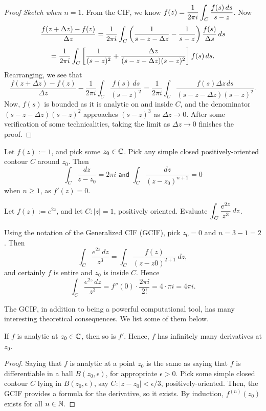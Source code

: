 \documentclass{article}
\begin{document}
\begin{proof}[Proof Sketch when $n=1$]
From the CIF, we know $f(z) = \displaystyle\frac 1{2\pi i} \int_C \frac{f(s)\, ds}{s-z}$. Now
$$\frac{f(z+\Delta z) - f(z)}{\Delta z} = \frac 1{2\pi i}\int_C \left(\frac 1{s-z-\Delta z} - \frac 1{s-z} \right) \frac{f(s)}{\Delta s}\, ds$$
$$=\frac 1{2\pi i}\int_C\left[\frac 1{(s-z)^2} + \frac{\Delta z}{(s-z-\Delta z)(s-z)^2}\right] f(s)\, ds.$$
Rearranging, we see that
$$\frac{f(z+\Delta z) - f(z)}{\Delta z} - \frac 1{2\pi i}\int_C \frac{f(s)\, ds}{(s-z)^2} = \frac 1{2\pi i}\int_C \frac{f(s)\Delta z\, ds}{(s-z-\Delta z)(s-z)^2}.$$
Now, $f(s)$ is bounded as it is analytic on and inside $C$, and the denominator $(s-z-\Delta z)(s-z)^2$ approaches $(s-z)^3$ as $\Delta z\to 0$. After some verification of some technicalities, taking the limit as $\Delta z\to 0$ finishes the proof.
\end{proof}
\begin{example}
Let $f(z) := 1$, and pick some $z_0\in\mathbb C$. Pick any simple closed positively-oriented contour $C$ around $z_0$. Then
$$\int_C \frac{dz}{z-z_0} = 2\pi i \textsf{ and } \int_C\frac{dz}{(z-z_0)^{n+1}} = 0$$
when $n\geq 1$, as $f'(z) = 0$.
\end{example}
\begin{example}
Let $f(z) := e^{2z}$, and let $C: |z|=1$, positively oriented. Evaluate $\displaystyle\int_C \frac{e^{2z}}{z^3}\, dz$.
\end{example}
\begin{solution}
Using the notation of the Generalized CIF (GCIF), pick $z_0 = 0$ and $n=3-1 = 2$. Then
$$\int_C \frac{e^{2z}\, dz}{z^3} = \int_C \frac{f(z)}{(z-z0)^{2+1}}\, dz,$$
and certainly $f$ is entire and $z_0$ is inside $C$. Hence
$$\int_C \frac{e^{2z}\, dz}{z^3} = f''(0) \cdot \frac{2\pi i}{2!} = 4\cdot \pi i = \boxed{4\pi i}.$$
\end{solution}

The GCIF, in addition to being a powerful computational tool, has many interesting theoretical consequences. We list some of them below.
\newpage
\begin{theorem}
If $f$ is analytic at $z_0\in\mathbb C$, then so is $f'$. Hence, $f$ has infinitely many derivatives at $z_0$.
\end{theorem}
\begin{proof}
Saying that $f$ is analytic at a point $z_0$ is the same as saying that $f$ is differentiable in a ball $B(z_0, \epsilon)$, for appropriate $\epsilon > 0$. Pick some simple closed contour $C$ lying in $B(z_0, \epsilon)$, say $C: |z-z_0| < \epsilon/3$, positively-oriented. Then, the GCIF provides a formula for the derivative, so it exists. By induction, $f^{(n)}(z_0)$ exists for all $n\in\mathbb N$.
\end{proof}
\end{document}
